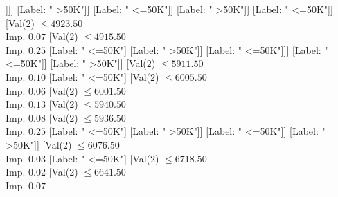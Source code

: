 \documentclass[margin=10pt]{standalone}
\begin{document}
\begin{forest}
																												[Val($2$) $ \leq 4756.50$ \\ Imp. $0.19$
																													[Val($2$) $ \leq 4544.50$ \\ Imp. $0.24$
																														[Val($2$) $ \leq 4474.50$ \\ Imp. $0.32$
																															[Val($2$) $ \leq 4398.50$ \\ Imp. $0.07$
																																[Label: " >50K"]
																																[Val($2$) $ \leq 4459.50$ \\ Imp. $0.32$
																																	[Label: " <=50K"]
																																	[Val($2$) $ \leq 4469.50$ \\ Imp. $1.00$
																																		[Label: " >50K"]
																																		[Label: " <=50K"]]]]
																															[Label: " >50K"]]
																														[Label: " <=50K"]]
																													[Label: " >50K"]]
																												[Label: " <=50K"]]
																											[Val($2$) $ \leq 4923.50$ \\ Imp. $0.07$
																												[Val($2$) $ \leq 4915.50$ \\ Imp. $0.25$
																													[Label: " <=50K"]
																													[Label: " >50K"]]
																												[Label: " <=50K"]]]
																										[Label: " <=50K"]]
																									[Label: " >50K"]]
																								[Val($2$) $ \leq 5911.50$ \\ Imp. $0.10$
																									[Label: " <=50K"]
																									[Val($2$) $ \leq 6005.50$ \\ Imp. $0.06$
																										[Val($2$) $ \leq 6001.50$ \\ Imp. $0.13$
																											[Val($2$) $ \leq 5940.50$ \\ Imp. $0.08$
																												[Val($2$) $ \leq 5936.50$ \\ Imp. $0.25$
																													[Label: " <=50K"]
																													[Label: " >50K"]]
																												[Label: " <=50K"]]
																											[Label: " >50K"]]
																										[Val($2$) $ \leq 6076.50$ \\ Imp. $0.03$
																											[Label: " <=50K"]
																											[Val($2$) $ \leq 6718.50$ \\ Imp. $0.02$
																												[Val($2$) $ \leq 6641.50$ \\ Imp. $0.07$

\end{forest}
\end{document}

